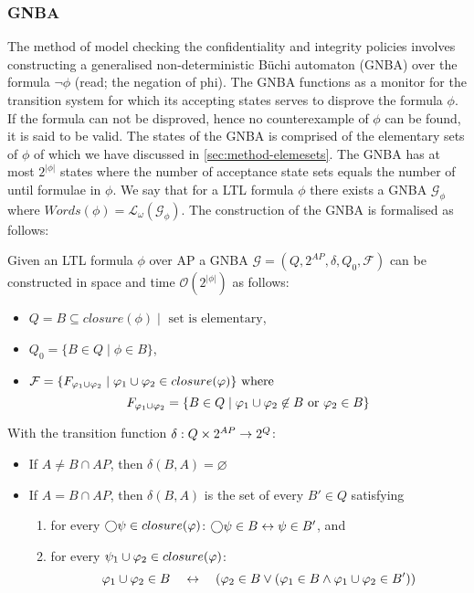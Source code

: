 \subsubsection{GNBA}
The method of model checking the confidentiality and integrity policies involves constructing a generalised non-deterministic Büchi automaton (GNBA) over the formula $\lnot\phi$ (read; the negation of phi). The GNBA functions as a monitor for the transition system for which its accepting states serves to disprove the formula $\phi$. If the formula can not be disproved, hence no counterexample of $\phi$ can be found, it is said to be valid. The states of the GNBA is comprised of the elementary sets of $\phi$ of which we have discussed in \autoref{sec:method-elemesets}. The GNBA has at most $2^{|\phi|}$ states where the number of acceptance state sets equals the number of until formulae in $\phi$. We say that for a LTL formula $\phi$ there exists a GNBA $\mathcal{G_\phi}$ where $Words(\phi)=\mathcal{L}_\omega(\mathcal{G_\phi})$. The construction of the GNBA is formalised as follows:
\begin{definition}
\label{def:ltl-to-gnba}
Given an LTL formula $\phi$ over AP a GNBA $\mathcal{G}=(Q,2^{AP},\delta,Q_0,\mathcal{F})$ can be constructed in space and time $\mathcal{O}(2^{|\phi|})$ as follows:
\begin{itemize}
    \item $Q = B \subseteq closure(\phi) \mid \text{ set is elementary}$,
    \item $Q_0 = \{ B \in Q \mid \phi \in B \}$,
    \item $\mathcal{F} = \{F_{\varphi_1 \cup \varphi_2} \mid \varphi_1 \cup \varphi_2 \in closure(\varphi)\} \text{ where }$
    \begin{equation*}
        F_{\varphi_1 \cup \varphi_2} = \{B \in Q \mid \varphi_1 \cup \varphi_2 \not\in B \text{ or } \varphi_2 \in B\}
    \end{equation*}
\end{itemize}
With the transition function $\delta : Q \times 2^{AP} \rightarrow 2^Q$:
\begin{itemize}
    \item If $A \neq B \cap AP$, then $\delta(B,A)=\varnothing$
    \item If $A = B \cap AP$, then $\delta(B,A)$ is the set of every $B'\in Q$ satisfying
    \begin{enumerate}
        \item for every $\bigcirc\psi \in closure(\varphi)$: $\bigcirc\psi \in B \leftrightarrow \psi \in B'$, and
        \item for every $\psi_1 \cup \varphi_2 \in closure(\varphi)$:
        \begin{equation*}
            \varphi_1 \cup \varphi_2 \in B \quad\leftrightarrow\quad (\varphi_2 \in B \lor (\varphi_1 \in B \land \varphi_1 \cup \varphi_2 \in B'))
        \end{equation*}
    \end{enumerate}
\end{itemize}
\end{definition}

